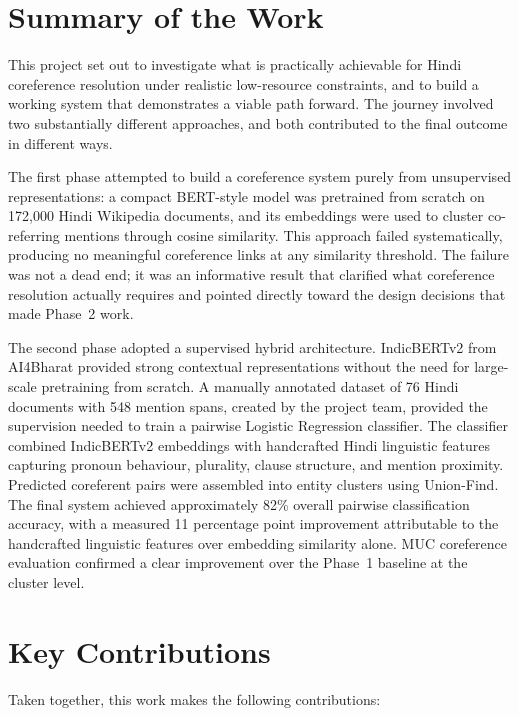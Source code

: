 \documentclass[12pt,a4paper]{report}
\begin{document}
\section{Summary of the Work}

This project set out to investigate what is practically achievable for Hindi coreference resolution under realistic low-resource constraints, and to build a working system that demonstrates a viable path forward. The journey involved two substantially different approaches, and both contributed to the final outcome in different ways.

The first phase attempted to build a coreference system purely from unsupervised representations: a compact BERT-style model was pretrained from scratch on 172,000 Hindi Wikipedia documents, and its embeddings were used to cluster co-referring mentions through cosine similarity. This approach failed systematically, producing no meaningful coreference links at any similarity threshold. The failure was not a dead end; it was an informative result that clarified what coreference resolution actually requires and pointed directly toward the design decisions that made Phase~2 work.

The second phase adopted a supervised hybrid architecture. IndicBERTv2 from AI4Bharat provided strong contextual representations without the need for large-scale pretraining from scratch. A manually annotated dataset of 76 Hindi documents with 548 mention spans, created by the project team, provided the supervision needed to train a pairwise Logistic Regression classifier. The classifier combined IndicBERTv2 embeddings with handcrafted Hindi linguistic features capturing pronoun behaviour, plurality, clause structure, and mention proximity. Predicted coreferent pairs were assembled into entity clusters using Union-Find. The final system achieved approximately 82\% overall pairwise classification accuracy, with a measured 11 percentage point improvement attributable to the handcrafted linguistic features over embedding similarity alone. MUC coreference evaluation confirmed a clear improvement over the Phase~1 baseline at the cluster level.

\section{Key Contributions}

Taken together, this work makes the following contributions:
\end{document}
